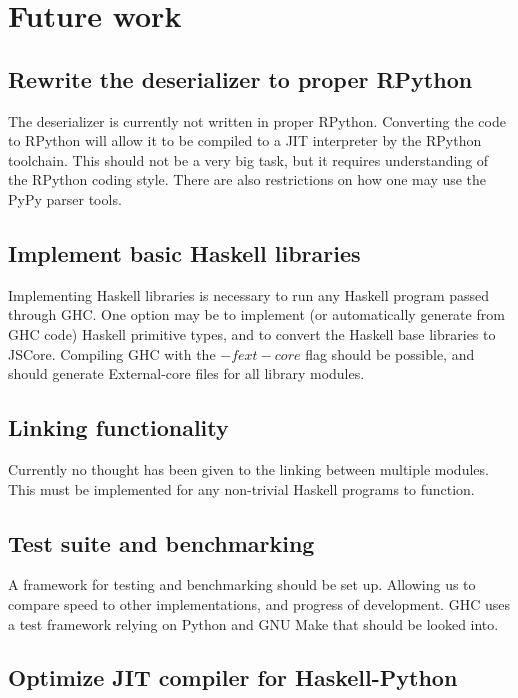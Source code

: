 \section{Future work}

\subsection{Rewrite the deserializer to proper RPython}

The deserializer is currently not written in proper RPython. 
Converting the code to RPython will allow it to be compiled to a JIT interpreter by
the RPython toolchain. This should not be a very big task, but it requires understanding
of the RPython coding style. There are also restrictions on how one may use the PyPy parser
tools.

\subsection{Implement basic Haskell libraries}

Implementing Haskell libraries is necessary to run any Haskell program passed 
through GHC. One option may be to implement (or automatically generate from GHC code) Haskell
primitive types, and to convert the Haskell base libraries to JSCore. Compiling GHC with the 
$-fext-core$ flag should be possible, and should generate
External-core files for all library modules.

\subsection{Linking functionality}

Currently no thought has been given to the linking between multiple modules. This
must be implemented for any non-trivial Haskell programs to function.

\subsection{Test suite and benchmarking}

A framework for testing and benchmarking should be set up. Allowing us to compare
speed to other implementations, and progress of development. GHC uses a test framework
relying on Python and GNU Make that should be looked into.

\subsection{Optimize JIT compiler for Haskell-Python}

